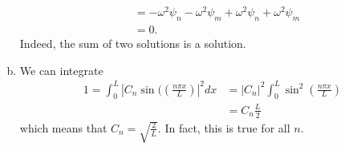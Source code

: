 \documentclass[12pt]{article} %
\begin{document}
\begin{solution}
\begin{enumerate}[(a)]
\begin{align*}
    &= -\omega^2 \psi_n -\omega^2\psi_m+\omega^2\psi_n + \omega^2\psi_m\\
    &=0.
\end{align*}
Indeed, the sum of two solutions is a solution.
\item We can integrate
\begin{align*}
1=\int_0^L \left|C_n\sin(\left(\frac{n\pi x}{L}\right)\right|^2dx&= |C_n|^2 \int_0^L \sin^2\left(\frac{n \pi x}{L}\right)\\
&= C_n \frac{L}{2}
\end{align*}
which means that $C_n=\sqrt{\frac{2}{L}}$. In fact, this is true for all $n$.
\end{enumerate}
\end{solution}
\end{document}
